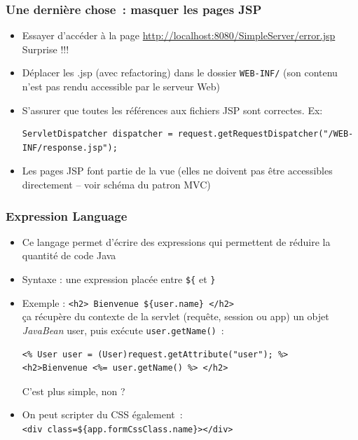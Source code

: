 \documentclass{beamer}
\begin{document}
\begin{frame}[fragile]
	\frametitle{Une dernière chose~: masquer les pages JSP}
	\begin{itemize}
		\item Essayer d'accéder à la page \url{http://localhost:8080/SimpleServer/error.jsp}\\
		Surprise !!!
		\item Déplacer les .jsp (avec refactoring) dans le dossier \texttt{WEB-INF/} (son contenu n'est pas rendu accessible par le serveur Web)
		\item S'assurer que toutes les références aux fichiers JSP sont correctes. Ex:\\
		\begin{lstlisting}
ServletDispatcher dispatcher = request.getRequestDispatcher("/WEB-INF/response.jsp");
		\end{lstlisting}
		\item Les pages JSP font partie de la vue (elles ne doivent pas être accessibles directement -- voir schéma du patron MVC)
	\end{itemize}
\end{frame}

\begin{frame}[fragile]
	\frametitle{Expression Language}
	\begin{itemize}
		\item Ce langage permet d'écrire des expressions qui permettent de réduire la quantité de code Java
		\item Syntaxe : une expression placée entre \texttt{\$\{} et \texttt{\}}
		\item Exemple : \texttt{<h2> Bienvenue \$\{user.name\} </h2>}\\
		ça récupère du contexte de la servlet (requête, session ou app) un objet \textit{JavaBean} user, puis exécute \texttt{user.getName()}~:
\begin{lstlisting}
<% User user = (User)request.getAttribute("user"); %>
<h2>Bienvenue <%= user.getName() %> </h2>		
\end{lstlisting}
C'est plus simple, non ?
\item On peut scripter du CSS également~:\\
\texttt{<div class=\$\{app.formCssClass.name\}></div>}
	\end{itemize}
\end{frame}
\end{document}
